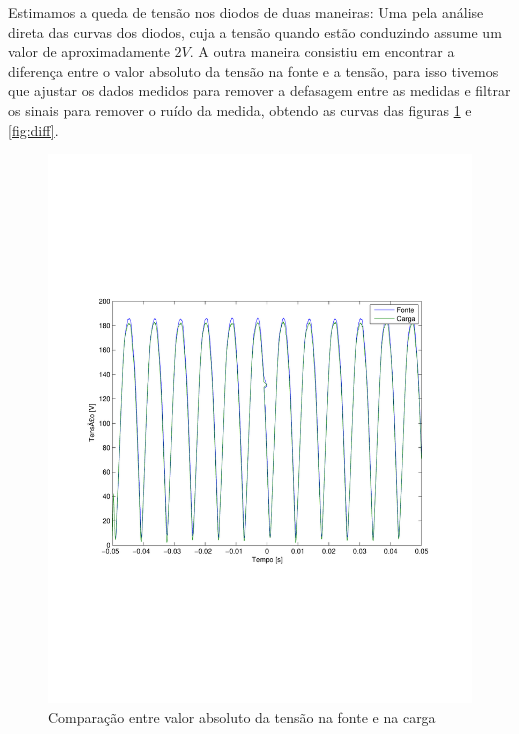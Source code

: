 \documentclass{report}
\begin{document}
Estimamos a queda de tensão nos diodos de duas maneiras: Uma pela análise direta das curvas dos diodos, cuja a tensão quando estão conduzindo assume um valor de aproximadamente $2 V$. A outra maneira consistiu em encontrar a diferença entre o valor absoluto da tensão na fonte e a tensão, para isso tivemos que ajustar os dados medidos para remover a defasagem entre as medidas e filtrar os sinais para remover o ruído da medida, obtendo as curvas das figuras \ref{fig:abs} e \ref{fig:diff}.

\begin{figure}[H]
	\centering
	\includegraphics[width=\linewidth]{dados/monofasico/abs}
	\caption{Comparação entre valor absoluto da tensão na fonte e na carga}
	\label{fig:abs}
\end{figure}
\end{document}
